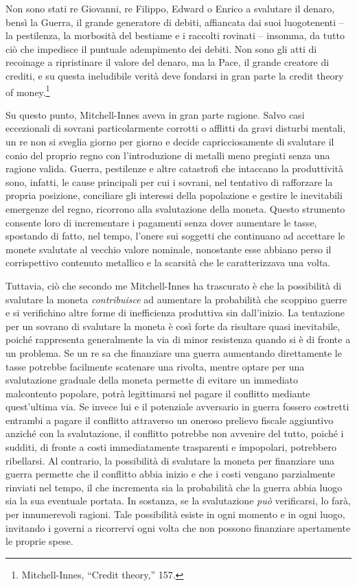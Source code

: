 \documentclass[
  a5paper,
  smalldemyvopaper,10pt,twoside,onecolumn,openright,extrafontsizes,hidelinks]{memoir}
\renewenvironment{quote}%
               {\list{}{\rightmargin=.6cm\leftmargin=.6cm}%
                \itshape \item[]}%
               {\endlist}
\begin{document}
\begin{quote}
Non sono stati re Giovanni, re Filippo, Edward o Enrico a svalutare il
denaro, bensì la Guerra, il grande generatore di debiti, affiancata dai
suoi luogotenenti -- la pestilenza, la morbosità del bestiame e i
raccolti rovinati -- insomma, da tutto ciò che impedisce il puntuale
adempimento dei debiti. Non sono gli atti di recoinage a ripristinare il
valore del denaro, ma la Pace, il grande creatore di crediti, e su
questa ineludibile verità deve fondarsi in gran parte la credit theory
of money.\footnote{Mitchell-Innes, ``Credit theory,'' 157.}
\end{quote}

Su questo punto, Mitchell-Innes aveva in gran parte ragione. Salvo casi
eccezionali di sovrani particolarmente corrotti o afflitti da gravi
disturbi mentali, un re non si sveglia giorno per giorno e decide
capricciosamente di svalutare il conio del proprio regno con
l'introduzione di metalli meno pregiati senza una ragione valida.
Guerra, pestilenze e altre catastrofi che intaccano la produttività
sono, infatti, le cause principali per cui i sovrani, nel tentativo di
rafforzare la propria posizione, conciliare gli interessi della
popolazione e gestire le inevitabili emergenze del regno, ricorrono alla
svalutazione della moneta. Questo strumento consente loro di
incrementare i pagamenti senza dover aumentare le tasse, spostando di
fatto, nel tempo, l'onere sui soggetti che continuano ad accettare le
monete svalutate al vecchio valore nominale, nonostante esse abbiano
perso il corrispettivo contenuto metallico e la scarsità che le
caratterizzava una volta.

Tuttavia, ciò che secondo me Mitchell-Innes ha trascurato è che la
possibilità di svalutare la moneta \emph{contribuisce} ad aumentare la
probabilità che scoppino guerre e si verifichino altre forme di
inefficienza produttiva sin dall'inizio. La tentazione per un sovrano di
svalutare la moneta è così forte da risultare quasi inevitabile, poiché
rappresenta generalmente la via di minor resistenza quando si è di
fronte a un problema. Se un re sa che finanziare una guerra aumentando
direttamente le tasse potrebbe facilmente scatenare una rivolta, mentre
optare per una svalutazione graduale della moneta permette di evitare un
immediato malcontento popolare, potrà legittimarsi nel pagare il
conflitto mediante quest'ultima via. Se invece lui e il potenziale
avversario in guerra fossero costretti entrambi a pagare il conflitto
attraverso un oneroso prelievo fiscale aggiuntivo anziché con la
svalutazione, il conflitto potrebbe non avvenire del tutto, poiché i
sudditi, di fronte a costi immediatamente trasparenti e impopolari,
potrebbero ribellarsi. Al contrario, la possibilità di svalutare la
moneta per finanziare una guerra permette che il conflitto abbia inizio
e che i costi vengano parzialmente rinviati nel tempo, il che incrementa
sia la probabilità che la guerra abbia luogo sia la sua eventuale
portata. In sostanza, se la svalutazione \emph{può} verificarsi, lo
farà, per innumerevoli ragioni. Tale possibilità esiste in ogni momento
e in ogni luogo, invitando i governi a ricorrervi ogni volta che non
possono finanziare apertamente le proprie spese.
\end{document}
